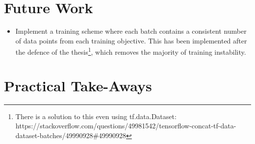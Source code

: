 \section{Future Work}

\begin{itemize}
  \item
    Implement a training scheme where each batch contains a consistent number of data points from each training objective.
    This has been implemented after the defence of the thesis\footnote{There is a solution to this even using tf.data.Dataset: https://stackoverflow.com/questions/49981542/tensorflow-concat-tf-data-dataset-batches/49990928\#49990928}, which removes the majority of training instability.
\end{itemize}

\section{Practical Take-Aways}
